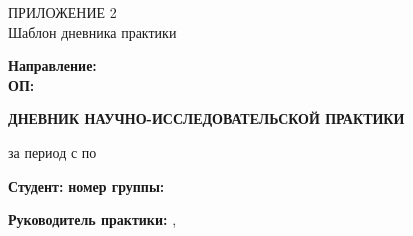 \begin{flushright}
{\large ПРИЛОЖЕНИЕ 2}\\[0.5em]
Шаблон дневника практики
\end{flushright}

\vspace{1em}

\begin{center}
\textbf{\MakeUppercase{\UniversityName}}
\end{center}

\noindent\textbf{Направление:} \DirectionName\\
\textbf{ОП:} \ProgramName

\vspace{1em}

\begin{center}
{\Large\bfseries ДНЕВНИК НАУЧНО-ИССЛЕДОВАТЕЛЬСКОЙ ПРАКТИКИ}
\end{center}

\noindent за период с \PracticeStart{} по \PracticeEnd

\noindent\textbf{Студент:} \StudentName \hfill \textbf{номер группы:} \StudentGroup

\noindent\textbf{Руководитель практики:} \SupervisorName, \SupervisorRole

\vspace{1em}

